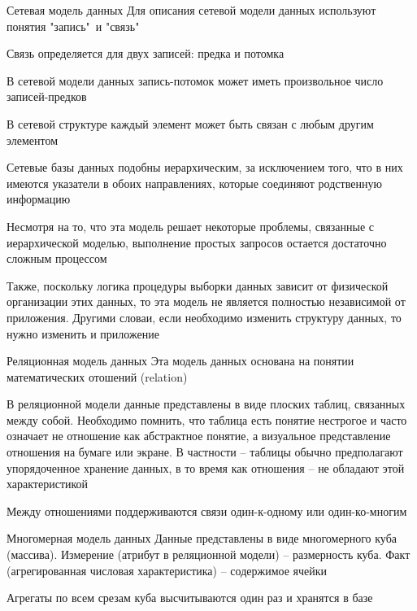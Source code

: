 \documentclass[12pt]{article}
\begin{document}
\begin{defin}{Сетевая модель данных}
    Для описания сетевой модели данных используют понятия "запись"\ и "связь"\ 

    Связь определяется для двух записей: предка и потомка 

    В сетевой модели данных запись-потомок может иметь произвольное число записей-предков 

    В сетевой структуре каждый элемент может быть связан с любым другим элементом 

    Сетевые базы данных подобны иерархическим, за исключением того, что в них имеются указатели в обоих направлениях, которые соединяют родственную информацию 

    Несмотря на то, что эта модель решает некоторые проблемы, связанные с иерархической моделью, выполнение простых запросов остается достаточно сложным процессом 

    Также, поскольку логика процедуры выборки данных зависит от физической организации этих данных, то эта модель не является полностью независимой от приложения. Другими словаи, если необходимо изменить структуру данных, то нужно изменить и приложение 
\end{defin}

\begin{defin}{Реляционная модель данных}
    Эта модель данных основана на понятии математических отошений (relation)

    В реляционной модели данные представлены в виде плоских таблиц, связанных между собой. Необходимо помнить, что таблица есть понятие нестрогое и часто означает не отношение как абстрактное понятие, а визуальное представление отношения на бумаге или экране. В частности -- таблицы обычно предполагают упорядоченное хранение данных, в то время как отношения -- не обладают этой характеристикой 

    Между отношениями поддерживаются связи один-к-одному или один-ко-многим 
\end{defin}

\begin{defin}{Многомерная модель данных}
    Данные представлены в виде многомерного куба (массива). Измерение (атрибут в реляционной модели) -- размерность куба. Факт (агрегированная числовая характеристика) -- содержимое ячейки 

    Агрегаты по всем срезам куба высчитываются один раз и хранятся в базе 
\end{defin}
\end{document}
